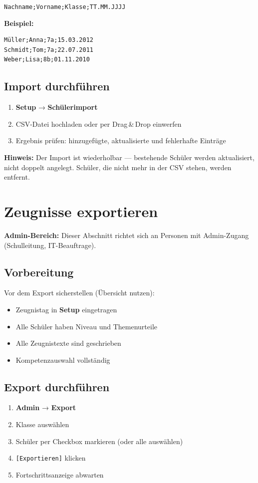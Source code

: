 \documentclass[12pt,a4paper]{article}
\newcommand{\info}[1]{\begin{infobox}\textbf{Hinweis:} #1\end{infobox}}
\newcommand{\adminonly}{\begin{adminbox}\textbf{Admin-Bereich:}
Dieser Abschnitt richtet sich an Personen mit Admin-Zugang (Schulleitung, IT-Beauftrage).\end{adminbox}}
\newcommand{\menu}[1]{\textbf{\textcolor{primary}{#1}}}
\newcommand{\key}[1]{\texttt{\small[#1]}}
\begin{document}
\begin{center}
\texttt{Nachname;Vorname;Klasse;TT.MM.JJJJ}
\end{center}

\textbf{Beispiel:}
\begin{verbatim}
Müller;Anna;7a;15.03.2012
Schmidt;Tom;7a;22.07.2011
Weber;Lisa;8b;01.11.2010
\end{verbatim}

\subsection{Import durchführen}
\begin{enumerate}[noitemsep]
  \item \menu{Setup} → \menu{Schülerimport}
  \item CSV-Datei hochladen oder per Drag\,\&\,Drop einwerfen
  \item Ergebnis prüfen: hinzugefügte, aktualisierte und fehlerhafte Einträge
\end{enumerate}

\info{Der Import ist wiederholbar — bestehende Schüler werden aktualisiert,
nicht doppelt angelegt. Schüler, die nicht mehr in der CSV stehen, werden entfernt.}

\section{Zeugnisse exportieren}

\adminonly

\subsection{Vorbereitung}
Vor dem Export sicherstellen (Übersicht nutzen):
\begin{itemize}[noitemsep]
  \item Zeugnistag in \menu{Setup} eingetragen
  \item Alle Schüler haben Niveau und Themenurteile
  \item Alle Zeugnistexte sind geschrieben
  \item Kompetenzauswahl vollständig
\end{itemize}

\subsection{Export durchführen}
\begin{enumerate}[noitemsep]
  \item \menu{Admin} → \menu{Export}
  \item Klasse auswählen
  \item Schüler per Checkbox markieren (oder alle auswählen)
  \item \key{Exportieren} klicken
  \item Fortschrittsanzeige abwarten
\end{enumerate}
\end{document}
